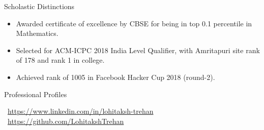 \documentclass[]{format}
\begin{document}
	\begin{cvsection}{Scholastic Distinctions}
	\vspace{2pt}
		\begin{cvsubsection}{}{}{}	
			\begin{itemize}
				\item Awarded certificate of excellence by CBSE for being in top 0.1 percentile in Mathematics.
                \item Selected for ACM-ICPC 2018 India Level Qualifier, with Amritapuri site rank of 178 and rank 1 in college.
                \item Achieved rank of 1005 in Facebook Hacker Cup 2018 (round-2).
			\end{itemize}
		\end{cvsubsection}
	\end{cvsection}
	
	\vspace{-5pt}
	
	\begin{cvsection}{Professional Profiles}
	    \vspace{2pt}
	    \begin{cvsubsection}{}{}{}
	    \textbullet\ \small{\url{https://www.linkedin.com/in/lohitaksh-trehan}} \hfill \textbullet\ \small{\url{https://github.com/LohitakshTrehan}}
	    \end{cvsubsection}
	\end{cvsection}
	
\end{document}
